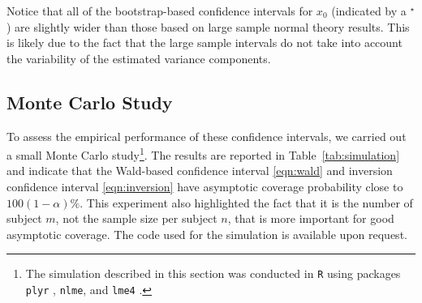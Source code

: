 \documentclass{article}\usepackage[]{graphicx}\usepackage[]{color}
\newcommand{\boot}{\ensuremath{^\star}}
\begin{document}
Notice that all of the bootstrap-based confidence intervals for $x_0$ (indicated by a $\boot$) are slightly wider than those based on large sample normal theory results. This is likely due to the fact that the large sample intervals do not take into account the variability of the estimated variance components.


\subsection{Monte Carlo Study}

To assess the empirical performance of these confidence intervals, we carried out a small Monte Carlo study\footnote{The simulation described in this section was conducted in \texttt{R} using packages \texttt{plyr} \citep{wickham-plyr-2011}, \texttt{nlme}, and \texttt{lme4} \citep{bates-lme4-2014}.}. The results are reported in Table~\ref{tab:simulation} and indicate that the Wald-based confidence interval \eqref{eqn:wald} and inversion confidence interval \eqref{eqn:inversion} have asymptotic coverage probability close to $100(1-\alpha)\%$.  This experiment also highlighted the fact that it is the number of subject $m$, not the sample size per subject $n$, that is more important for good asymptotic coverage.  The code used for the simulation is available upon request.
\end{document}
